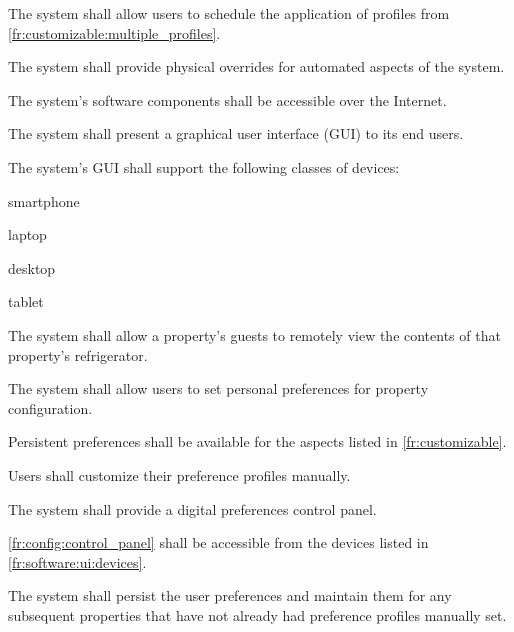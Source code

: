 \documentclass[letter,titlepage,oneside,english]{report}
\begin{document}
\begin{fr}
\begin{fr}
    The system shall allow users to schedule the application of profiles from \ref{fr:customizable:multiple_profiles}.
  \item
    The system shall provide physical overrides for automated aspects of the system.
  \end{fr}
\item\label{fr:software}
  The system's software components shall be accessible over the Internet.
  \begin{fr}
  \item\label{fr:software:ui}
    The system shall present a graphical user interface (GUI) to its end users.
    \begin{fr}
    \item\label{fr:software:ui:devices}
      The system's GUI shall support the following classes of devices:
      \begin{fr}
      \item
        smartphone
      \item
        laptop
      \item
        desktop
      \item
        tablet
      \end{fr}
    \end{fr}
  \item\label{fr:software:fridge}
    The system shall allow a property's guests to remotely view the contents of that property's refrigerator.
  \end{fr}
\item
  The system shall allow users to set personal preferences for property configuration.
  \begin{fr}
  \item
    Persistent preferences shall be available for the aspects listed in \ref{fr:customizable}.
  \item
    Users shall customize their preference profiles manually.
  \item\label{fr:config:control_panel}
    The system shall provide a digital preferences control panel.
    \begin{fr}
    \item\label{fr:config:control_panel:devices}
      \ref{fr:config:control_panel} shall be accessible from the devices listed in \ref{fr:software:ui:devices}.
    \end{fr}
  \item
    The system shall persist the user preferences and maintain them for any subsequent properties that have not already had preference profiles manually set.

\end{fr}
\end{fr}
\end{document}
